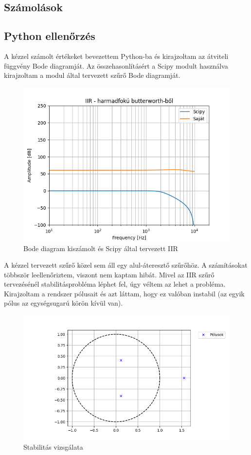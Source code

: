 \subsection{Számolások}


\subsection{Python ellenőrzés}

A kézzel számolt értékeket bevezettem Python-ba és kirajzoltam az átviteli függvény Bode diagramját. Az összehasonlításért a Scipy modult használva kirajzoltam a modul által tervezett szűrő Bode diagramját.

\begin{figure}[H]
    \centering
    \includegraphics[scale=0.7]{figures/bode.png}
    \caption{Bode diagram kiszámolt és Scipy által tervezett IIR}
\end{figure}

A kézzel tervezett szűrő közel sem áll egy alul-áteresztő szűrőhöz. A számításokat többször leellenőriztem, viszont nem kaptam hibát. Mivel az IIR szűrő tervezésénél stabilitásprobléma léphet fel, úgy véltem az lehet a probléma. Kirajzoltam a rendszer pólusait és azt láttam, hogy ez valóban instabil (az egyik pólus az egységsugarú körön kívül van).

\begin{figure}[H]
    \centering
    \includegraphics[scale=0.6]{figures/poles.png}
    \caption{Stabilitás vizsgálata}
\end{figure}

